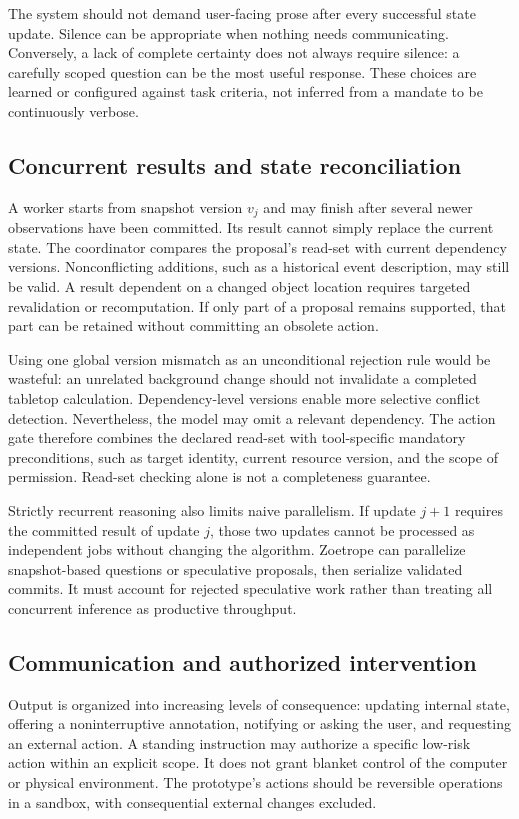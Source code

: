 \documentclass[11pt,letterpaper]{article}
\begin{document}
The system should not demand user-facing prose after every successful state update. Silence can be appropriate when nothing needs communicating. Conversely, a lack of complete certainty does not always require silence: a carefully scoped question can be the most useful response. These choices are learned or configured against task criteria, not inferred from a mandate to be continuously verbose.

\subsection{Concurrent results and state reconciliation}
A worker starts from snapshot version $v_j$ and may finish after several newer observations have been committed. Its result cannot simply replace the current state. The coordinator compares the proposal's read-set with current dependency versions. Nonconflicting additions, such as a historical event description, may still be valid. A result dependent on a changed object location requires targeted revalidation or recomputation. If only part of a proposal remains supported, that part can be retained without committing an obsolete action.

Using one global version mismatch as an unconditional rejection rule would be wasteful: an unrelated background change should not invalidate a completed tabletop calculation. Dependency-level versions enable more selective conflict detection. Nevertheless, the model may omit a relevant dependency. The action gate therefore combines the declared read-set with tool-specific mandatory preconditions, such as target identity, current resource version, and the scope of permission. Read-set checking alone is not a completeness guarantee.

Strictly recurrent reasoning also limits naive parallelism. If update $j+1$ requires the committed result of update $j$, those two updates cannot be processed as independent jobs without changing the algorithm. Zoetrope can parallelize snapshot-based questions or speculative proposals, then serialize validated commits. It must account for rejected speculative work rather than treating all concurrent inference as productive throughput.

\subsection{Communication and authorized intervention}
Output is organized into increasing levels of consequence: updating internal state, offering a noninterruptive annotation, notifying or asking the user, and requesting an external action. A standing instruction may authorize a specific low-risk action within an explicit scope. It does not grant blanket control of the computer or physical environment. The prototype's actions should be reversible operations in a sandbox, with consequential external changes excluded.
\end{document}
